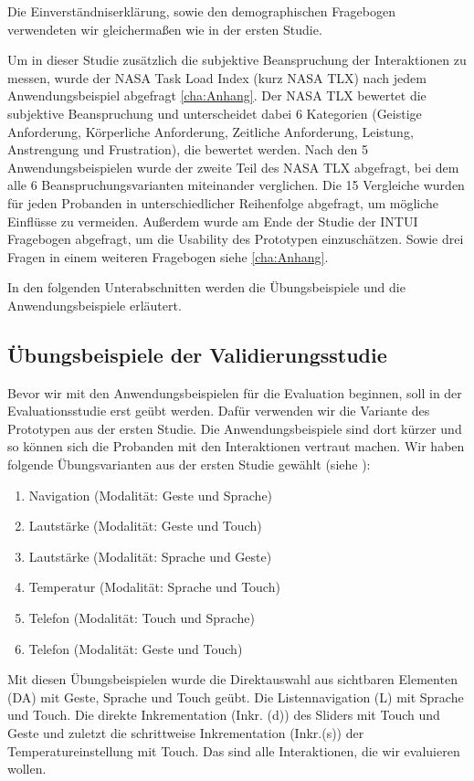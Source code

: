 Die Einverständniserklärung, sowie den demographischen Fragebogen verwendeten wir gleichermaßen wie in der ersten Studie. 

Um in dieser Studie zusätzlich die subjektive Beanspruchung der Interaktionen zu messen, wurde der NASA Task Load Index (kurz NASA TLX) nach jedem Anwendungsbeispiel abgefragt \ref{cha:Anhang}. 
Der NASA TLX bewertet die subjektive Beanspruchung und unterscheidet dabei 6 Kategorien (Geistige Anforderung, Körperliche Anforderung, Zeitliche Anforderung, Leistung, Anstrengung und Frustration), die bewertet werden. 
Nach den 5 Anwendungsbeispielen wurde der zweite Teil des NASA TLX abgefragt, bei dem alle 6 Beanspruchungsvarianten miteinander verglichen. 
Die 15 Vergleiche wurden für jeden Probanden in unterschiedlicher Reihenfolge abgefragt, um mögliche Einflüsse zu vermeiden. 
Außerdem wurde am Ende der Studie der INTUI Fragebogen abgefragt, um die Usability des Prototypen einzuschätzen. 
Sowie drei Fragen in einem weiteren Fragebogen siehe \ref{cha:Anhang}. 
  
In den folgenden Unterabschnitten werden die Übungsbeispiele und die Anwendungsbeispiele erläutert. 
\subsection[Übungsbeispiele]{Übungsbeispiele der Validierungsstudie}
Bevor wir mit den Anwendungsbeispielen für die Evaluation beginnen, soll in der Evaluationsstudie erst geübt werden. 
Dafür verwenden wir die Variante des Prototypen aus der ersten Studie. 
Die Anwendungsbeispiele sind dort kürzer und so können sich die Probanden mit den Interaktionen vertraut machen.
Wir haben folgende Übungsvarianten aus der ersten Studie gewählt (siehe ):
\begin{enumerate}
	\item Navigation (Modalität: Geste und Sprache)
	\item Lautstärke (Modalität: Geste und Touch)
	\item Lautstärke (Modalität: Sprache und Geste)
	\item Temperatur (Modalität: Sprache und Touch)
	\item Telefon (Modalität: Touch und Sprache)
	\item Telefon (Modalität: Geste und Touch)
\end{enumerate}
Mit diesen Übungsbeispielen wurde die Direktauswahl aus sichtbaren Elementen (DA) mit Geste, Sprache und Touch geübt. Die Listennavigation (L) mit Sprache und Touch. Die direkte Inkrementation (Inkr. (d)) des Sliders mit Touch und Geste und zuletzt die schrittweise Inkrementation (Inkr.(s)) der Temperatureinstellung mit Touch. Das sind alle Interaktionen, die wir evaluieren wollen. 
